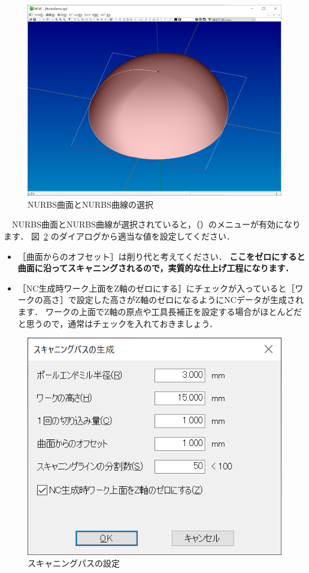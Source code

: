 \begin{figure}[H]
\centering
\includegraphics[scale=0.5]{No2/fig/fig22.png}
\caption{NURBS曲面とNURBS曲線の選択}
\label{fig:ncvc22}
\end{figure}

　NURBS曲面とNURBS曲線が選択されていると，（）のメニューが有効になります．
図~\ref{fig:ncvc23} のダイアログから適当な値を設定してください．

\begin{itemize}
\item ［曲面からのオフセット］は削り代と考えてください．
\textbf{ここをゼロにすると曲面に沿ってスキャニングされるので，実質的な仕上げ工程になります．}
\item ［NC生成時ワーク上面をZ軸のゼロにする］にチェックが入っていると［ワークの高さ］で設定した高さがZ軸のゼロになるようにNCデータが生成されます．
ワークの上面でZ軸の原点や工具長補正を設定する場合がほとんどだと思うので，通常はチェックを入れておきましょう．
\end{itemize}

\begin{figure}[H]
\centering
\includegraphics{No2/fig/fig23.png}
\caption{スキャニングパスの設定}
\label{fig:ncvc23}
\end{figure}


